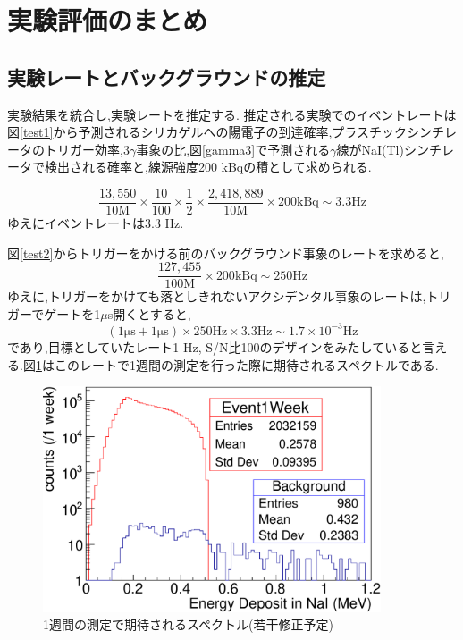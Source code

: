 \section{実験評価のまとめ}
\label{section_testall}

\subsection{実験レートとバックグラウンドの推定}
実験結果を統合し,実験レートを推定する.
推定される実験でのイベントレートは図\ref{test1}から予測されるシリカゲルへの陽電子の到達確率,プラスチックシンチレータのトリガー効率,$3\gamma$事象の比,図\ref{gamma3}で予測される$\gamma$線がNaI(Tl)シンチレータで検出される確率と,線源強度200 kBqの積として求められる.

\begin{equation}
	\nonumber
	\frac{13,550}{10 \mathrm{M}} \times \frac{10}{100} \times \frac{1}{2} \times \frac{2,418,889}{10 \mathrm{M}} \times 200 \mathrm{kBq} \sim 3.3 \mathrm{Hz}
\end{equation}
ゆえにイベントレートは3.3 Hz.

図\ref{test2}からトリガーをかける前のバックグラウンド事象のレートを求めると,
\begin{equation}
	\nonumber
	\frac{127,455}{100\mathrm{M}} \times 200 \mathrm{kBq} \sim 250 \mathrm{ Hz}
\end{equation}
ゆえに,トリガーをかけても落としきれないアクシデンタル事象のレートは,トリガーでゲートを1$\mu$s開くとすると,
\begin{equation}
	\nonumber
	( 1 \mathrm{\mu} \mathrm{s} + 1 \mathrm{\mu} \mathrm{s} ) \times  250 \mathrm{Hz} \times 3.3 \mathrm{Hz} \sim 1.7 \times 10^{-3} \mathrm{Hz}
\end{equation}
であり,目標としていたレート1 Hz, S/N比100のデザインをみたしていると言える.図\ref{test_all}はこのレートで1週間の測定を行った際に期待されるスペクトルである.

\begin{figure}[htbp]
	\centering
		\includegraphics[width=10cm]{fig/test_all.pdf}
	\caption{1週間の測定で期待されるスペクトル(若干修正予定)}
	\label{test_all}
\end{figure}



